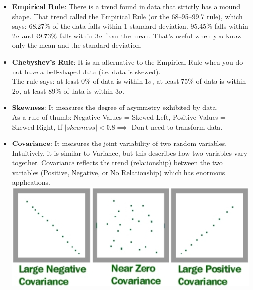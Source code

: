 \documentclass[11pt, twocolumn]{article}
\begin{document}
\begin{itemize}
\item \textbf{Empirical Rule}:
There is a trend found in data that strictly has a mound shape. That trend called the Empirical Rule (or the 68–95–99.7 rule), which says: 
 68.27\% of the data falls within 1 standard deviation.
 95.45\% falls within $2\sigma$ 
 and 99.73\% falls within $3\sigma$ from the mean.
 That's useful when you know only the mean and the standard deviation.
\end{itemize}

\begin{itemize}
\item \textbf{Chebyshev's Rule}:
It is an alternative to the Empirical Rule when you {\color{red} do not} have a bell-shaped data (i.e. data is skewed).\\
The rule says: {\color{blue} at least} 0\% of data is within $1\sigma$, {\color{blue} at least} 75\% of data is within $2\sigma$, {\color{blue} at least} 89\% of data is within $3\sigma$.
\end{itemize}

\begin{itemize}
\item \textbf{Skewness}:
It measures the degree of asymmetry exhibited by data.\\ As a rule of thumb: Negative Values = Skewed Left, Positive Values = Skewed Right, If $|skewness| < 0.8 \implies$ Don't need to transform data.
\end{itemize}

\begin{itemize}
\item \textbf{Covariance}:
It measures the joint {\color{blue}variability} of two random variables. Intuitively, it is similar to Variance, but this describes how {\color{blue}two} variables vary {\color{blue}together}. Covariance reflects the trend (relationship) between the two variables (Positive, Negative, or No Relationship) which has enormous applications.
\includegraphics[width=\linewidth,keepaspectratio]{figs/covariance.jpeg}

\end{itemize}
\end{document}
